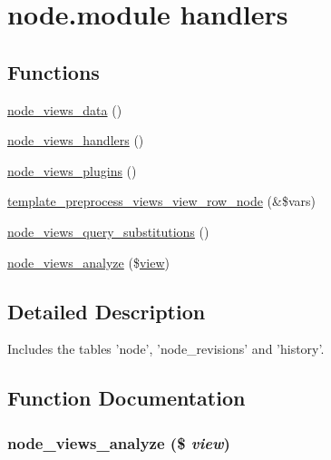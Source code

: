 \hypertarget{group__views__node__module}{
\section{node.module handlers}
\label{group__views__node__module}
}
\subsection*{Functions}
\begin{CompactItemize}
\item 
\hyperlink{group__views__node__module_g5e6beb23be547a792dba68f1066d4b9d}{node\_\-views\_\-data} ()
\item 
\hyperlink{group__views__node__module_g601148852d1241238b6d713ca487ca85}{node\_\-views\_\-handlers} ()
\item 
\hyperlink{group__views__node__module_gbad6697258bb04f10bbb73608ab1f52c}{node\_\-views\_\-plugins} ()
\item 
\hyperlink{group__views__node__module_g7ab8a726f775b848f49ada743dae0e58}{template\_\-preprocess\_\-views\_\-view\_\-row\_\-node} (\&\$vars)
\item 
\hyperlink{group__views__node__module_g207da742d80ba74315d7084eeed285b9}{node\_\-views\_\-query\_\-substitutions} ()
\item 
\hyperlink{group__views__node__module_g6060098a01aedf1a74dba4720f806654}{node\_\-views\_\-analyze} (\$\hyperlink{classview}{view})
\end{CompactItemize}


\subsection{Detailed Description}
Includes the tables 'node', 'node\_\-revisions' and 'history'. 

\subsection{Function Documentation}
\hypertarget{group__views__node__module_g6060098a01aedf1a74dba4720f806654}{
\subsubsection[{node\_\-views\_\-analyze}]{\setlength{\rightskip}{0pt plus 5cm}node\_\-views\_\-analyze (\$ {\em view})}}
\label{group__views__node__module_g6060098a01aedf1a74dba4720f806654}


